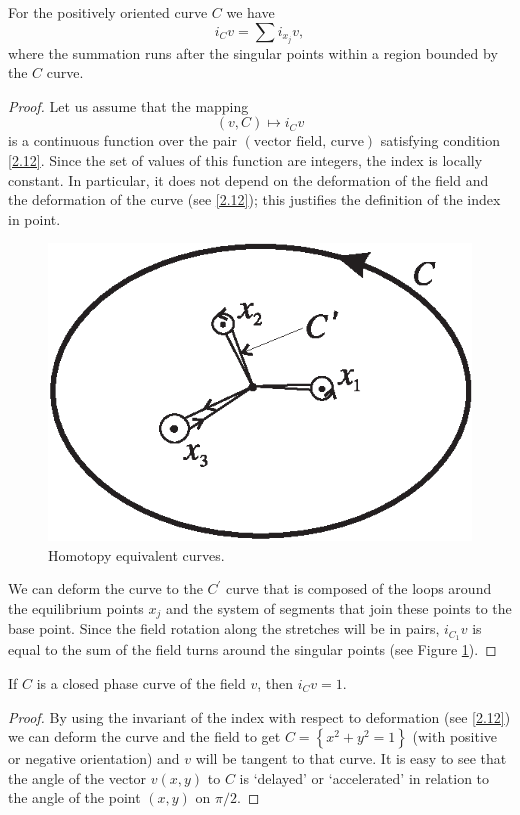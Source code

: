 \begin{proposition}
	For the positively oriented curve $ C $ we have
	$$
	i_{C}v=\sum i_{x_{j}}v,
	$$
	where the summation runs after the singular points within a region bounded by the $ C $ curve.
	
	\begin{proof}
		Let us assume that the mapping
		$$
		\left( v,C\right) \longmapsto i_{C}v
		$$
		is a continuous function over the pair $\left( \text{vector field, curve}\right) $ satisfying condition \eqref{2.12}. Since the set of values of this function are integers, the index is locally constant. In particular, it does not depend on the deformation of the field and the deformation of the curve (see \eqref{2.12}); this justifies the definition of the index in point.
		
		\begin{figure}[!ht]
			\centering
			\includegraphics [scale=1.2]{jtr211}
			\caption{Homotopy equivalent curves.}
			\label{fig:2.11}
		\end{figure}
		We can deform the curve to the $ C ^ {\prime}$ curve that is composed of the loops around the equilibrium points $ x_ {j} $ and the system of segments that join these points to the base point. Since the field rotation along the stretches will be in pairs, $ i_ {C_ {1}} v $ is equal to the sum of the field turns around the singular points (see Figure \ref{fig:2.11}).
	\end{proof}
\end{proposition}

\begin{lemma}
	If $ C $ is a closed phase curve of the field $ v $, then $ i_ {C} v =  1$.
	\begin{proof}
		By using the invariant of the index with respect to deformation (see \eqref{2.12}) we can deform the curve and the field to get $ C = \left \{x ^ {2} + y ^ {2} = 1 \right \} $ (with positive or negative orientation) and $ v $ will be tangent to that curve. It is easy to see that the angle of the vector $ v (x, y) $ to $ C $ is `delayed' or `accelerated' in relation to the angle of the point $ \left (x, y \right) $ on $ \pi / 2 $.
	\end{proof}
\end{lemma}

